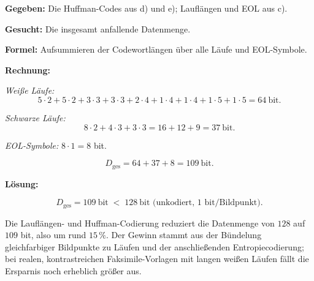 \begin{beispiel}

\textbf{Gegeben:} Die Huffman-Codes aus d) und e); Lauflängen und EOL aus c).

\textbf{Gesucht:} Die insgesamt anfallende Datenmenge.

\textbf{Formel:} Aufsummieren der Codewortlängen über alle Läufe und EOL-Symbole.

\textbf{Rechnung:}

\emph{Weiße Läufe:}
$$
5\cdot 2 + 5\cdot 2 + 3\cdot 3 + 3\cdot 3 + 2\cdot 4 + 1\cdot 4 + 1\cdot 4
+ 1\cdot 5 + 1\cdot 5 = 64\ \text{bit}.
$$

\emph{Schwarze Läufe:}
$$
8\cdot 2 + 4\cdot 3 + 3\cdot 3 = 16 + 12 + 9 = 37\ \text{bit}.
$$

\emph{EOL-Symbole:} $8\cdot 1 = 8$ bit.

$$
D_{\text{ges}} = 64 + 37 + 8 = 109\ \text{bit}.
$$

\textbf{Lösung:}

$$
\boxed{\;D_{\text{ges}} = 109\ \text{bit}
\;<\; 128\ \text{bit (unkodiert, 1 bit/Bildpunkt).}\;}
$$

Die Lauflängen- und Huffman-Codierung reduziert die Datenmenge von $128$ auf
$109$ bit, also um rund $15\,\%$. Der Gewinn stammt aus der Bündelung
gleichfarbiger Bildpunkte zu Läufen und der anschließenden Entropiecodierung;
bei realen, kontrastreichen Faksimile-Vorlagen mit langen weißen Läufen fällt
die Ersparnis noch erheblich größer aus.

\end{beispiel}
